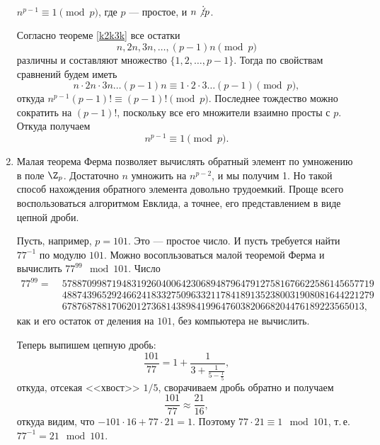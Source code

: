 \begin{enumerate}
\begin{thrm}
$n^{p-1}\equiv 1\pmod p$, где $p$ --- простое, и $n\not\vdots p$.
\end{thrm}

Согласно теореме \ref{k2k3k} все остатки
$$
n,2n,3n,\dots,(p-1)n\pmod p
$$
различны и составляют множество $\{1,2,\dots,p-1\}$. Тогда по свойствам сравнений будем иметь
$$
n\cdot 2n\cdot 3n \dots(p-1)n\equiv 1\cdot 2\cdot 3\dots (p-1)\pmod p,
$$
откуда $n^{p-1}(p-1)!\equiv (p-1)!\pmod p$. Последнее тождество можно сократить на $(p-1)!$, поскольку все его множители взаимно просты с $p$. Откуда получаем
$$
n^{p-1}\equiv 1\pmod p.
$$

\item Малая теорема Ферма позволяет вычислять обратный элемент по умножению в поле $\Z_p$. Достаточно $n$ умножить на $n^{p-2}$, и мы получим 1. Но такой способ нахождения обратного элемента довольно трудоемкий. Проще всего воспользоваться алгоритмом Евклида, а точнее, его представлением в виде цепной дроби.

Пусть, например, $p=101$. Это --- простое число. И пусть требуется найти $77^{-1}$ по модулю $101$. Можно восопльзоваться малой теоремой Ферма и вычислить $77^{99}\mod 101$. Число
\begin{align*}
77^{99} =\; & 578870998719483192604006423068948796479127581676622586145657719 \\
            & 488743965292466241833275096332117841891352380031908081644221279 \\
            & 6787687881706201273681438984199647603820668204476189223565013,
\end{align*}
как и его остаток от деления на $101$, без компьютера не вычислить.

Теперь выпишем цепную дробь:
$$
\frac{101}{77} = 1 + \frac{1}{3 + \frac{1}{5 - \frac 15}},
$$
откуда, отсекая <<хвост>> $1/5$, сворачиваем дробь обратно и получаем
$$
\frac{101}{77} \approx \frac{21}{16},
$$
откуда видим, что $-101\cdot 16 + 77\cdot 21 = 1$. Поэтому $77\cdot 21\equiv 1\mod 101$, т.\,е. $77^{-1}=21\mod 101$.

\end{enumerate}

